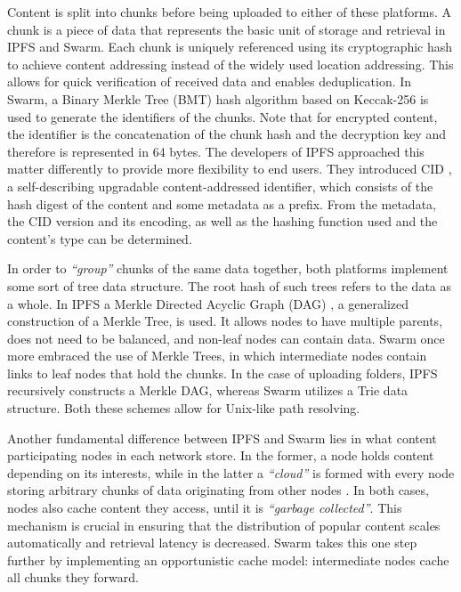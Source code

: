 Content is split into chunks before being uploaded to either of these platforms. A chunk is a piece of data that represents the basic unit of storage and retrieval in IPFS and Swarm. Each chunk is uniquely referenced using its cryptographic hash to achieve content addressing instead of the widely used location addressing. This allows for quick verification of received data and enables deduplication. In Swarm, a Binary Merkle Tree (BMT)  \citep{tron_2020} hash algorithm based on Keccak-256 is used to generate the identifiers of the chunks. Note that for encrypted content, the identifier is the concatenation of the chunk hash and the decryption key and therefore is represented in 64 bytes. The developers of IPFS approached this matter differently to provide more flexibility to end users. They introduced CID  \citep{multiformat}, a self-describing upgradable content-addressed identifier, which consists of the hash digest of the content and some metadata as a prefix. From the metadata, the CID version and its encoding, as well as the hashing function used and the content’s type can be determined.

In order to \emph{``group''} chunks of the same data together, both platforms implement some sort of tree data structure. The root hash of such trees refers to the data as a whole. In IPFS a Merkle Directed Acyclic Graph (DAG)  \citep{benet_2014}, a generalized construction of a Merkle Tree, is used. It allows nodes to have multiple parents, does not need to be balanced, and non-leaf nodes can contain data. Swarm once more embraced the use of Merkle Trees, in which intermediate nodes contain links to leaf nodes that hold the chunks. In the case of uploading folders, IPFS recursively constructs a Merkle DAG, whereas Swarm utilizes a Trie  \citep{tron_2020} data structure. Both these schemes allow for Unix-like path resolving.

Another fundamental difference between IPFS and Swarm lies in what content participating nodes in each network store. In the former, a node holds content depending on its interests, while in the latter a \emph{``cloud''} is formed with every node storing arbitrary chunks of data originating from other nodes \citep{swarmwiki_2019}. In both cases, nodes also cache content they access, until it is \emph{``garbage collected''}. This mechanism is crucial in ensuring that the distribution of popular content scales automatically and retrieval latency is decreased. Swarm takes this one step further by implementing an opportunistic cache model: intermediate nodes cache all chunks they forward.

